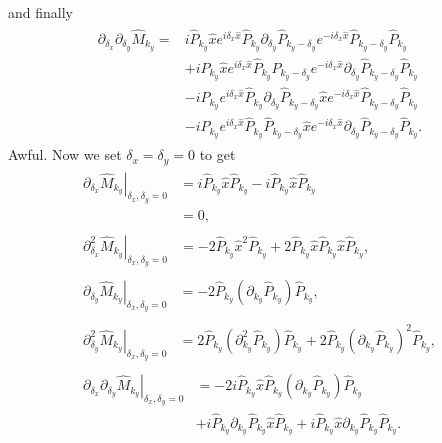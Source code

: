 and finally
\begin{align}
	\begin{split}
		\partial_{\delta_x}\partial_{\delta_y} \hat M_{k_y} = 
		& i \hat P_{k_y} \hat x  e^{i \delta_x \hat x}  \hat P_{k_y}\partial_{\delta_y}  \hat P_{k_y - \delta_y} e^{-i \delta_x \hat x}  \hat P_{k_y - \delta_y} \hat P_{k_y} \\
		&+ i \hat P_{k_y} \hat x  e^{i \delta_x \hat x}  \hat P_{k_y} \hat P_{k_y - \delta_y} e^{-i \delta_x \hat x}  \partial_{\delta_y}\hat P_{k_y - \delta_y} \hat P_{k_y} \\
		&-  i \hat P_{k_y}   e^{i \delta_x \hat x}  \hat P_{k_y} \partial_{\delta_y}\hat P_{k_y - \delta_y} \hat x e^{-i \delta_x \hat x}  \hat P_{k_y - \delta_y} \hat P_{k_y}\\
		&-  i \hat P_{k_y}   e^{i \delta_x \hat x}  \hat P_{k_y} \hat P_{k_y - \delta_y} \hat x e^{-i \delta_x \hat x}  \partial_{\delta_y}\hat P_{k_y - \delta_y} \hat P_{k_y}.
	\end{split}
\end{align}
Awful. Now we set $\delta_x = \delta_y = 0 $ to get
\begin{align}
	\begin{split}
		\left . \partial_{\delta_x} \hat M_{k_y} \right |_{\delta_x , \delta_y = 0} &= 
		 i \hat P_{k_y} \hat x  \hat P_{k_y} -  i \hat P_{k_y}  \hat x\hat P_{k_y}\\
		& = 0,
	\end{split}\\
	\begin{split}
		\left . \partial_{\delta_x}^2 \hat M_{k_y} \right |_{\delta_x , \delta_y = 0} & = 
		 - 2\hat P_{k_y} \hat x^2   \hat P_{k_y} + 2\hat P_{k_y} \hat x  \hat P_{k_y} \hat x \hat P_{k_y} ,
	\end{split}\\
	\begin{split}
		\left . \partial_{\delta_y} \hat M_{k_y} \right |_{\delta_x , \delta_y = 0}& = 
		 -2\hat P_{k_y} \left ( \partial_{k_y} \hat P_{k_y} \right ) \hat P_{k_y},
	\end{split}\\
	\begin{split}
		\left . \partial_{\delta_y}^2 \hat M_{k_y} \right |_{\delta_x , \delta_y = 0}& = 
		 2 \hat P_{k_y} \left ( \partial_{k_y}^2 \hat P_{k_y}  \right ) \hat P_{k_y}
		+2  \hat P_{k_y}    \left ( \partial_{k_y} \hat P_{k_y } \right )^2 \hat P_{k_y},
	\end{split}\\
	\begin{split}
		\left . \partial_{\delta_x}\partial_{\delta_y} \hat M_{k_y} \right |_{\delta_x , \delta_y = 0}&= 
		-2 i \hat P_{k_y} \hat x \hat P_{k_y} \left ( \partial_{k_y}  \hat P_{k_y} \right)  \hat P_{k_y} \\
		&+  i   \hat P_{k_y} \partial_{k_y}\hat P_{k_y} \hat x  \hat P_{k_y } 
		+ i  \hat P_{k_y} \hat x  \partial_{k_y}\hat P_{k_y} \hat P_{k_y}.
	\end{split}
\end{align}
